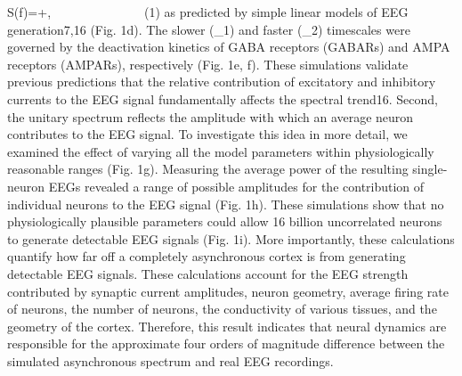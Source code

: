 S\left(f\right)=+,\ \ \ \ \ \ \ \ \ \ \ \ \ \ \ (1)
as predicted by simple linear models of EEG generation7,16 (Fig. 1d). The slower (\tau_1) and faster (\tau_2) timescales were governed by the deactivation kinetics of GABA receptors (GABARs) and AMPA receptors (AMPARs), respectively (Fig. 1e, f). These simulations validate previous predictions that the relative contribution of excitatory and inhibitory currents to the EEG signal fundamentally affects the spectral trend16.
Second, the unitary spectrum reflects the amplitude with which an average neuron contributes to the EEG signal. To investigate this idea in more detail, we examined the effect of varying all the model parameters within physiologically reasonable ranges (Fig. 1g). Measuring the average power of the resulting single-neuron EEGs revealed a range of possible amplitudes for the contribution of individual neurons to the EEG signal (Fig. 1h). These simulations show that no physiologically plausible parameters could allow 16 billion uncorrelated neurons to generate detectable EEG signals (Fig. 1i). More importantly, these calculations quantify how far off a completely asynchronous cortex is from generating detectable EEG signals. These calculations account for the EEG strength contributed by synaptic current amplitudes, neuron geometry, average firing rate of neurons, the number of neurons, the conductivity of various tissues, and the geometry of the cortex. Therefore, this result indicates that neural dynamics are responsible for the approximate four orders of magnitude difference between the simulated asynchronous spectrum and real EEG recordings.

